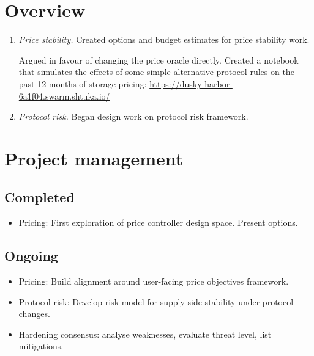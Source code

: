 \maketitle
\section*{Overview}

\begin{enumerate}
  \item \emph{Price stability.}
    Created options and budget estimates for price stability work.

    Argued in favour of changing the price oracle directly.  Created a notebook that simulates the effects of some simple alternative protocol rules on the past 12 months of storage pricing: \url{https://dusky-harbor-6a1f04.swarm.shtuka.io/}

  \item \emph{Protocol risk.} 
    Began design work on protocol risk framework.

\end{enumerate}

\section*{Project management}

\subsection*{Completed}

\begin{itemize}
  \item Pricing: First exploration of price controller design space. Present options.
\end{itemize}

\subsection*{Ongoing}

\begin{itemize}
  \item Pricing: Build alignment around user-facing price objectives framework. 
  \item Protocol risk: Develop risk model for supply-side stability under protocol changes.
  \item Hardening consensus: analyse weaknesses, evaluate threat level, list mitigations.
\end{itemize}


